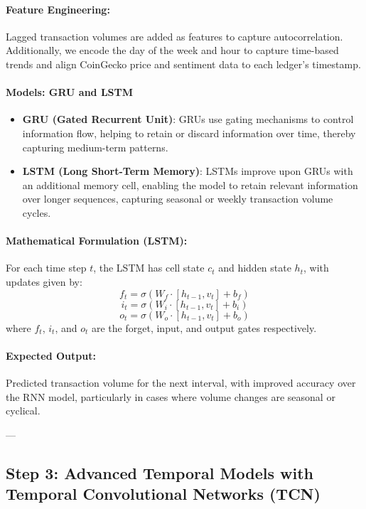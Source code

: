 \documentclass{article}
\begin{document}
\paragraph{Feature Engineering:}
Lagged transaction volumes are added as features to capture autocorrelation. Additionally, we encode the day of the week and hour to capture time-based trends and align CoinGecko price and sentiment data to each ledger's timestamp.

\paragraph{Models: GRU and LSTM}
\begin{itemize}
    \item \textbf{GRU (Gated Recurrent Unit)}: GRUs use gating mechanisms to control information flow, helping to retain or discard information over time, thereby capturing medium-term patterns.
    \item \textbf{LSTM (Long Short-Term Memory)}: LSTMs improve upon GRUs with an additional memory cell, enabling the model to retain relevant information over longer sequences, capturing seasonal or weekly transaction volume cycles.
\end{itemize}

\paragraph{Mathematical Formulation (LSTM):}
For each time step $t$, the LSTM has cell state $c_t$ and hidden state $h_t$, with updates given by:
\[
f_t = \sigma(W_f \cdot [h_{t-1}, v_t] + b_f)
\]
\[
i_t = \sigma(W_i \cdot [h_{t-1}, v_t] + b_i)
\]
\[
o_t = \sigma(W_o \cdot [h_{t-1}, v_t] + b_o)
\]
where $f_t$, $i_t$, and $o_t$ are the forget, input, and output gates respectively.

\paragraph{Expected Output:} 
Predicted transaction volume for the next interval, with improved accuracy over the RNN model, particularly in cases where volume changes are seasonal or cyclical.

---

\subsection{Step 3: Advanced Temporal Models with Temporal Convolutional Networks (TCN)}
\end{document}
